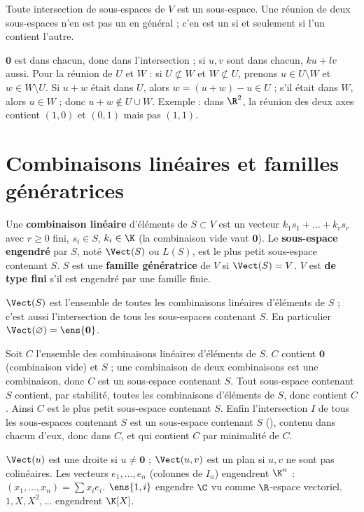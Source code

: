 \begin{proposition}\label{prop-inter-sev}
Toute intersection de sous-espaces de $V$ est un sous-espace. Une réunion de deux sous-espaces n'en est pas un en général ; c'en est un si et seulement si l'un contient l'autre.
\end{proposition}
\begin{preuve}
$\mathbf 0$ est dans chacun, donc dans l'intersection ; si $u,v$ sont dans chacun, $ku+lv$ aussi. Pour la réunion de $U$ et $W$ : si $U\not\subset W$ et $W\not\subset U$, prenons $u\in U\setminus W$ et $w\in W\setminus U$. Si $u+w$ était dans $U$, alors $w=(u+w)-u\in U$ ; s'il était dans $W$, alors $u\in W$ ; donc $u+w\notin U\cup W$. Exemple : dans $\R^2$, la réunion des deux axes contient $(1,0)$ et $(0,1)$ mais pas $(1,1)$.
\end{preuve}

\section{Combinaisons linéaires et familles génératrices}
\begin{definition}
Une \textbf{combinaison linéaire} d'éléments de $S\subset V$ est un vecteur $k_1s_1+\dots+k_rs_r$ avec $r\ge0$ fini, $s_i\in S$, $k_i\in\K$ (la combinaison vide vaut $\mathbf 0$). Le \textbf{sous-espace engendré} par $S$, noté $\Vect(S)$ ou $L(S)$, est le plus petit sous-espace contenant $S$. $S$ est une \textbf{famille génératrice} de $V$ si $\Vect(S)=V$. $V$ est \textbf{de type fini} s'il est engendré par une famille finie.
\end{definition}
\begin{theoreme}\label{thm-engendre}
$\Vect(S)$ est l'ensemble de toutes les combinaisons linéaires d'éléments de $S$ ; c'est aussi l'intersection de tous les sous-espaces contenant $S$. En particulier $\Vect(\varnothing)=\ens{\mathbf 0}$.
\end{theoreme}
\begin{preuve}
Soit $C$ l'ensemble des combinaisons linéaires d'éléments de $S$. $C$ contient $\mathbf 0$ (combinaison vide) et $S$ ; une combinaison de deux combinaisons est une combinaison, donc $C$ est un sous-espace contenant $S$. Tout sous-espace contenant $S$ contient, par stabilité, toutes les combinaisons d'éléments de $S$, donc contient $C$. Ainsi $C$ est le plus petit sous-espace contenant $S$. Enfin l'intersection $I$ de tous les sous-espaces contenant $S$ est un sous-espace contenant $S$ (), contenu dans chacun d'eux, donc dans $C$, et qui contient $C$ par minimalité de $C$.
\end{preuve}
\begin{exemple}
$\Vect(u)$ est une droite si $u\neq\mathbf 0$ ; $\Vect(u,v)$ est un plan si $u,v$ ne sont pas colinéaires. Les vecteurs $e_1,\dots,e_n$ (colonnes de $I_n$) engendrent $\K^n$ : $(x_1,\dots,x_n)=\sum x_ie_i$. $\ens{1,i}$ engendre $\C$ vu comme $\R$-espace vectoriel. $1,X,X^2,\dots$ engendrent $\K[X]$.
\end{exemple}


